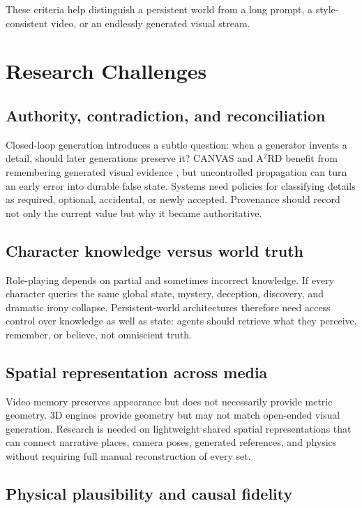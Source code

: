 \documentclass{article}
\begin{document}
These criteria help distinguish a persistent world from a long prompt, a style-consistent video, or an endlessly generated visual stream.

\section{Research Challenges}

\subsection{Authority, contradiction, and reconciliation}

Closed-loop generation introduces a subtle question: when a generator invents a detail, should later generations preserve it? CANVAS and A$^2$RD benefit from remembering generated visual evidence \citep{mondal2026canvas,long2026a2rd}, but uncontrolled propagation can turn an early error into durable false state. Systems need policies for classifying details as required, optional, accidental, or newly accepted. Provenance should record not only the current value but why it became authoritative.

\subsection{Character knowledge versus world truth}

Role-playing depends on partial and sometimes incorrect knowledge. If every character queries the same global state, mystery, deception, discovery, and dramatic irony collapse. Persistent-world architectures therefore need access control over knowledge as well as state: agents should retrieve what they perceive, remember, or believe, not omniscient truth.

\subsection{Spatial representation across media}

Video memory preserves appearance but does not necessarily provide metric geometry. 3D engines provide geometry but may not match open-ended visual generation. Research is needed on lightweight shared spatial representations that can connect narrative places, camera poses, generated references, and physics without requiring full manual reconstruction of every set.

\subsection{Physical plausibility and causal fidelity}
\end{document}
